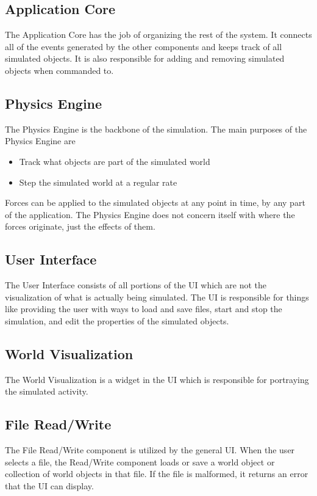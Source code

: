 \subsection{Application Core}
The Application Core has the job of organizing the rest of the system. It connects all of the events generated by the other components and keeps track of all simulated objects. It is also responsible for adding and removing simulated objects when commanded to.

\subsection{Physics Engine}
The Physics Engine is the backbone of the simulation. The main purposes of the Physics Engine are
	\begin{itemize}
		\item Track what objects are part of the simulated world
		\item Step the simulated world at a regular rate
	\end{itemize}
Forces can be applied to the simulated objects at any point in time, by any part of the application. The Physics Engine does not concern itself with where the forces originate, just the effects of them.
 
\subsection{User Interface}
The User Interface consists of all portions of the UI which are not the visualization of what is actually being simulated. The UI is responsible for things like providing the user with ways to load and save files, start and stop the simulation, and edit the properties of the simulated objects.

\subsection{World Visualization}
The World Visualization is a widget in the UI which is responsible for portraying the simulated activity.

\subsection{File Read/Write}
The File Read/Write component is utilized by the general UI. When the user selects a file, the Read/Write component loads or save a world object or collection of world objects in that file. If the file is malformed, it returns an error that the UI can display.

